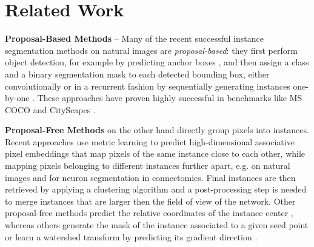 
\section{Related Work} \label{sec:related_work}
\textbf{Proposal-Based Methods} -- Many of the recent successful instance segmentation methods on natural images are \emph{proposal-based}: they first perform object detection, for example by predicting anchor boxes \cite{ren2015faster}, and then assign a class and a binary segmentation mask to each detected bounding box, either convolutionally \cite{he2017mask,porzi2019seamless,liu2018path,yang2012layered,li2017fully,ladicky2010and,hariharan2014simultaneous,chen2015multi,dai2016instance,liang2016reversible} or in a recurrent fashion by sequentially generating instances one-by-one \cite{romera2016recurrent,ren2017end}. These approaches have proven highly successful in benchmarks like MS COCO \cite{lin2014microsoft} and CityScapes \cite{cordts2016cityscapes}. 


\textbf{Proposal-Free Methods} on the other hand directly group pixels into instances. 
Recent approaches use metric learning to predict high-dimensional associative pixel embeddings that map pixels of the same instance close to each other, while mapping pixels belonging to different instances further apart, e.g. \cite{kong2018recurrentPix,fathi2017semantic,newell2017associative,de2017semantic} on natural images and \cite{lee2019learning} for neuron segmentation in connectomics. %
Final instances are then retrieved by applying a clustering algorithm and a post-processing step is needed to merge instances that are larger then the field of view of the network. 
Other proposal-free methods predict the relative coordinates of the instance center \cite{neven2019instance,cheng2019panopticdeeplab}, whereas others generate the mask of the instance associated to a given seed point \cite{sofiiuk2019adaptis} or  
learn a watershed transform by predicting its gradient direction \cite{bai2017deep}. 

